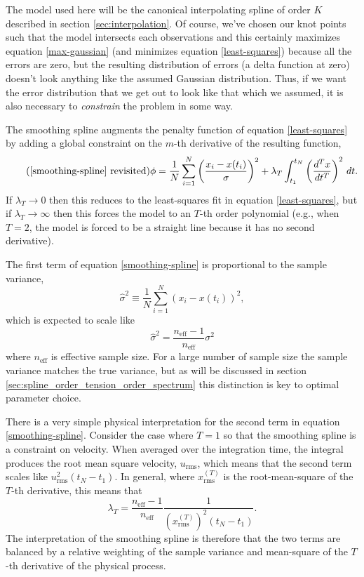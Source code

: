 \documentclass[10pt,journal]{IEEEtran}
\begin{document}
The model used here will be the canonical interpolating spline of order $K$ described in section \ref{sec:interpolation}. Of course, we've chosen our knot points such that the model intersects each observations and this certainly maximizes equation \ref{max-gaussian} (and minimizes equation \ref{least-squares}) because all the errors are zero, but the resulting distribution of errors (a delta function at zero) doesn't look anything like the assumed Gaussian distribution. Thus, if we want the error distribution that we get out to look like that which we assumed, it is also necessary to \emph{constrain} the problem in some way.

The smoothing spline augments the penalty function of equation \ref{least-squares} by adding a global constraint on the $m$-th derivative of the resulting function,
\begin{equation*}
\tag{\ref{smoothing-spline} revisited}
\phi =  \frac{1}{N}\sum_{i=1}^{N} \left( \frac{x_i - x(t_i)}{\sigma} \right) ^2 + \lambda_T \int_{t_1}^{t_N} \left(\frac{d^T x}{dt^T}\right)^2 \, dt.
\end{equation*}
If $\lambda_T \rightarrow 0$ then this reduces to the least-squares fit in equation \ref{least-squares}, but if $\lambda_T \rightarrow \infty$ then this forces the model to an $T$-th order polynomial (e.g., when $T=2$, the model is forced to be a straight line because it has no second derivative).

The first term of equation \ref{smoothing-spline} is proportional to the sample variance,
\begin{equation}
\label{sample_variance}
\hat{\sigma}^2  \equiv \frac{1}{N} \sum_{i=1}^{N} \left( x_i - x(t_i) \right) ^2,
\end{equation}
which is expected to scale like
\begin{equation}
\label{sample_variance_variance}
\hat{\sigma}^2 = \frac{n_{\textrm{eff}}-1}{n_{\textrm{eff}}} \sigma^2
\end{equation}
where $n_{\textrm{eff}}$ is effective sample size. For a large number of sample size the sample variance matches the true variance, but as will be discussed in section \ref{sec:spline_order_tension_order_spectrum} this distinction is key to optimal parameter choice.

There is a very simple physical interpretation for the second term in equation \ref{smoothing-spline}. Consider the case where $T=1$ so that the smoothing spline is a constraint on velocity. When averaged over the integration time, the integral produces the root mean square velocity, $u_{\textrm{rms}}$, which means that the second term scales like $u_{\textrm{rms}}^2 (t_N-t_1)$. In general, where $x^{(T)}_{\textrm{rms}}$ is the root-mean-square of the $T$-th derivative, this means that
\begin{equation}
\label{lambda}
\lambda_T = \frac{n_{\textrm{eff}}-1}{n_{\textrm{eff}}} \frac{1}{ \left(x^{(T)}_{\textrm{rms}}\right)^2 (t_N-t_1)}.
\end{equation}
The interpretation of the smoothing spline is therefore that the two terms are balanced by a relative weighting of the sample variance and mean-square of the $T$-th derivative of the physical process.
\end{document}
